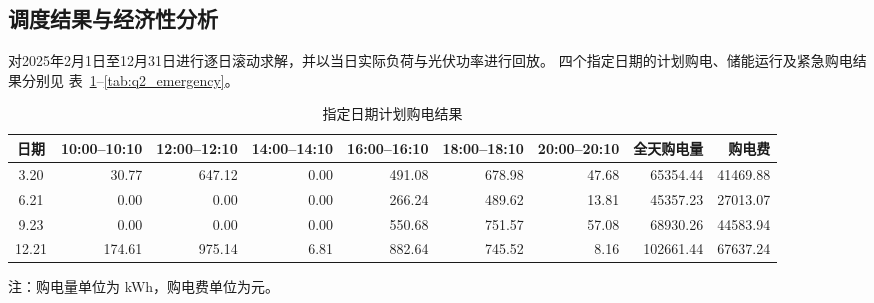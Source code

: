 \documentclass[zihao=-4,a4paper,UTF8,fontset=none]{ctexart}
\begin{document}
\subsection{调度结果与经济性分析}

对2025年2月1日至12月31日进行逐日滚动求解，并以当日实际负荷与光伏功率进行回放。
四个指定日期的计划购电、储能运行及紧急购电结果分别见
表~\ref{tab:q2_purchase}--\ref{tab:q2_emergency}。

\begin{table}[H]
    \centering
    \caption{指定日期计划购电结果}
    \label{tab:q2_purchase}
    \scriptsize
    \setlength{\tabcolsep}{2.6pt}
    \renewcommand{\arraystretch}{0.88}
    \begin{tabular}{c*{6}{r}rr}
        \toprule
        日期
        & 10:00--10:10 & 12:00--12:10 & 14:00--14:10
        & 16:00--16:10 & 18:00--18:10 & 20:00--20:10
        & 全天购电量 & 购电费 \\
        \midrule
        3.20  & 30.77  & 647.12 & 0.00 & 491.08 & 678.98 & 47.68
              & 65354.44  & 41469.88 \\
        6.21  & 0.00   & 0.00   & 0.00 & 266.24 & 489.62 & 13.81
              & 45357.23  & 27013.07 \\
        9.23  & 0.00   & 0.00   & 0.00 & 550.68 & 751.57 & 57.08
              & 68930.26  & 44583.94 \\
        12.21 & 174.61 & 975.14 & 6.81 & 882.64 & 745.52 & 8.16
              & 102661.44 & 67637.24 \\
        \bottomrule
    \end{tabular}

    {\scriptsize 注：购电量单位为 kWh，购电费单位为元。}
\end{table}

\vspace{-1mm}
\end{document}
